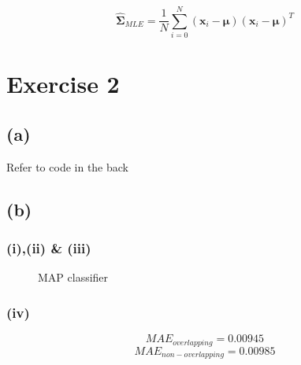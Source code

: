 \documentclass[11pt]{article}
\begin{document}
$$\hat{\pmb{\Sigma}}_{MLE}=\frac{1}{N}\sum_{i=0}^{N}(\pmb{x}_i-\pmb{\mu})(\pmb{x}_i-\pmb{\mu})^T$$

\section*{Exercise 2}
\subsection*{(a)}
\noindent Refer to code in the back
\subsection*{(b)}
\subsubsection*{(i),(ii) \& (iii)}
\begin{figure}[h]
	\centering
	\caption{MAP classifier}
\end{figure}

\subsubsection*{(iv)}
	$$MAE_{overlapping} = 0.00945$$
	$$MAE_{non-overlapping} = 0.00985$$
	
\end{document}
